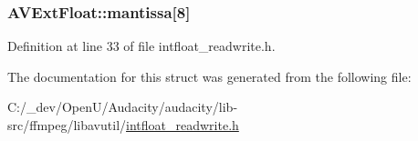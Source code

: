 \subsubsection[{\texorpdfstring{mantissa}{mantissa}}]{ A\+V\+Ext\+Float\+::mantissa\mbox{[}8\mbox{]}}\hypertarget{struct_a_v_ext_float_ad5136584e57730e43b595674717f4bd8}{}\label{struct_a_v_ext_float_ad5136584e57730e43b595674717f4bd8}


Definition at line 33 of file intfloat\+\_\+readwrite.\+h.



The documentation for this struct was generated from the following file\+:\begin{DoxyCompactItemize}
\item 
C\+:/\+\_\+dev/\+Open\+U/\+Audacity/audacity/lib-\/src/ffmpeg/libavutil/\hyperlink{intfloat__readwrite_8h}{intfloat\+\_\+readwrite.\+h}\end{DoxyCompactItemize}
